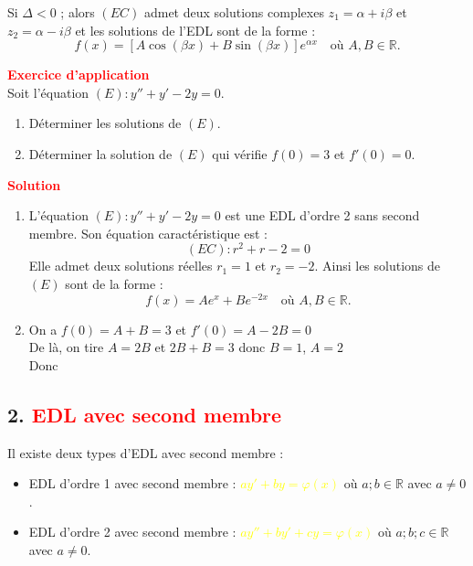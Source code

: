 \documentclass[12pt]{article}
\begin{document}
Si $\Delta < 0$ ; alors $(EC)$ admet deux solutions complexes $z_1 = \alpha + i\beta$ et $z_2 = \alpha - i\beta$ et les solutions de l’EDL sont de la forme :
\[
\boxed{f(x) = [A\cos(\beta x) + B\sin(\beta x)]e^{\alpha x}} \quad \text{où } A, B \in \mathbb{R}.
\]

\vspace{0.5cm}

\textbf{\textcolor{red}{Exercice d'application}}\\
Soit l’équation $(E) : y'' + y' - 2y = 0$.
\begin{enumerate}
    \item Déterminer les solutions de $(E)$.
    \item Déterminer la solution de $(E)$ qui vérifie $f(0) = 3$ et $f'(0) = 0$.
\end{enumerate}

\textbf{\textcolor{red}{Solution}}

\begin{enumerate}
    \item L’équation $(E) : y'' + y' - 2y = 0$ est une EDL d’ordre 2 sans second membre. Son équation caractéristique est :
    \[
    (EC) : r^2 + r - 2 = 0
    \]
    Elle admet deux solutions réelles $r_1 = 1$ et $r_2 = -2$. Ainsi les solutions de $(E)$ sont de la forme :
    \[
    \boxed{f(x) = Ae^{x} + Be^{-2x}} \quad \text{où } A, B \in \mathbb{R}.
    \]

    \item On a $f(0) = A + B = 3$ et $f'(0) = A - 2B = 0$\\
    De là, on tire $A = 2B$ et $2B + B = 3$ donc $B = 1$, $A = 2$\\
    Donc 
\end{enumerate}

\subsection*{2. \textcolor{red}{EDL avec second membre}}

Il existe deux types d’EDL avec second membre :

\begin{itemize}
    \item EDL d’ordre 1 avec second membre : \textcolor{yellow}{$ay' + by = \varphi(x)$} où $a ; b \in \mathbb{R}$ avec $a \neq 0$.
    \item EDL d’ordre 2 avec second membre : \textcolor{yellow}{$ay'' + by' + cy = \varphi(x)$} où $a ; b ; c \in \mathbb{R}$ avec $a \neq 0$.
\end{itemize}
\end{document}
